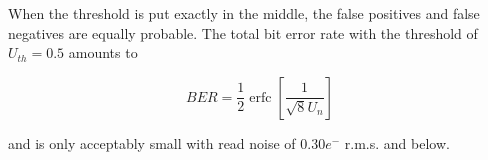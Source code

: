 When the threshold is put exactly in the middle, the false positives and false negatives are equally probable. The total bit error rate with the threshold of $U_{th}=0.5$ amounts to 

\begin{displaymath}
B E R=\frac{1}{2} \operatorname{erfc}\left[\frac{1}{\sqrt{8} U_{n}}\right]\end{displaymath}

and is only acceptably small with read noise of 0.30$e^{-}$ r.m.s. and below.
